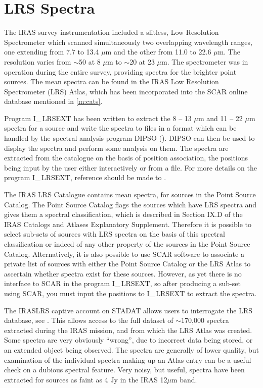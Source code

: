 \documentclass[11pt,nolof,noabs]{starlink}
\begin{document}
\section{LRS Spectra}
The IRAS survey instrumentation included a slitless, Low Resolution
Spectrometer which scanned simultaneously two overlapping wavelength ranges,
one extending from 7.7 to 13.4 $\mu$m and the other from 11.0 to 22.6 $\mu$m.
The resolution varies from $\sim$50 at 8 $\mu$m to $\sim$20 at 23 $\mu$m.
The spectrometer was in operation during the entire survey, providing spectra
for the brighter point sources.
The mean spectra can be found in the IRAS Low Resolution Spectrometer (LRS)
Atlas, which has been incorporated into the SCAR online database mentioned
in \ref{m:cats}.

Program I\_$\,$LRSEXT has been written to extract the 8 -- 13 $\mu$m and
11 -- 22 $\mu$m spectra for a source and write the spectra to files in a
format which can be handled by the spectral analysis program DIPSO ().
DIPSO can then be used to display the spectra and perform some analysis on them.
The spectra are extracted from the catalogue on the basis of position
association, the positions being input by the user either interactively or from
a file.
For more details on the program I\_$\,$LRSEXT, reference should be made to
.

The IRAS LRS Catalogue contains mean spectra, for sources in the Point
Source Catalog.
The Point Source Catalog flags the sources which have LRS spectra and gives
them a spectral classification, which is described in Section IX.D of the IRAS
Catalogs and Atlases Explanatory Supplement.
Therefore it is possible to select sub-sets of sources with LRS spectra on the
basis of this spectral classification or indeed of any other property of the
sources in the Point Source Catalog.
Alternatively, it is also possible to use SCAR software to associate a private
list of sources with either the Point Source Catalog or the LRS Atlas to
ascertain whether spectra exist for these sources.
However, as yet there is no interface to SCAR in the program I\_$\,$LRSEXT, so
after producing a sub-set using SCAR, you must input the positions to
I\_$\,$LRSEXT to extract the spectra.

The IRASLRS captive account on STADAT allows users to interrogate the LRS
database, see .
This allows access to the full dataset of $\sim$170,000 spectra extracted
during the IRAS mission, and from which the LRS Atlas was created.
Some spectra are very obviously ``wrong'', due to incorrect data being stored,
or an extended object being observed.
The spectra are generally of lower quality, but examination of the individual
spectra making up an Atlas entry can be a useful check on a dubious spectral
feature.
Very noisy, but useful, spectra have been extracted for sources as faint as
4 Jy in the IRAS 12$\mu$m band.
\end{document}
